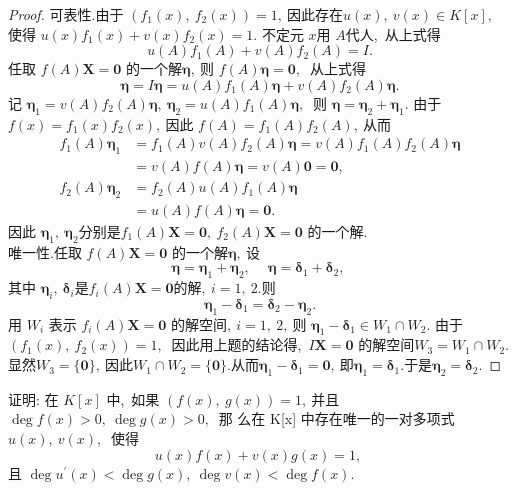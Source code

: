 \begin{proof}
	可表性.由于  $\left(f_{1}(x),\  f_{2}(x)\right)=1 ,\  $因此存在$  u(x),\  v(x) \in K[x] ,\ $ 使得  $u(x) f_{1}(x)+v(x) f_{2}(x)=1 .$
	不定元 $ x  $用  $A  $代人,\  从上式得
	$$u(A) f_{1}(A)+v(A) f_{2}(A)=I .$$
	任取 $ f(A) \boldsymbol{X}=\boldsymbol{0} $ 的一个解$  \boldsymbol{\eta} ,\  $则  $f(A) \boldsymbol{\eta}=\mathbf{0} ,\ $ 从上式得
	$$\boldsymbol{\eta}=I \boldsymbol{\eta}=u(A) f_{1}(A) \boldsymbol{\eta}+v(A) f_{2}(A) \boldsymbol{\eta} .$$
	记  $\boldsymbol{\eta}_{1}=v(A) f_{2}(A) \boldsymbol{\eta},\  \boldsymbol{\eta}_{2}=u(A) f_{1}(A) \boldsymbol{\eta} ,\ $ 则 $ \boldsymbol{\eta}=\boldsymbol{\eta}_{2}+\boldsymbol{\eta}_{1}  .$
	由于$  f(x)=f_{1}(x) f_{2}(x) ,\  $因此 $ f(A)=f_{1}(A) f_{2}(A) ,\  $从而
	$$\begin{aligned}
		f_{1}(A) \boldsymbol{\eta}_{1} & =f_{1}(A) v(A) f_{2}(A) \boldsymbol{\eta}=v(A) f_{1}(A) f_{2}(A) \boldsymbol{\eta} \\
		& =v(A) f(A) \boldsymbol{\eta}=v(A) \boldsymbol{0}=\mathbf{0},\  \\
		f_{2}(A) \boldsymbol{\eta}_{2} & =f_{2}(A) u(A) f_{1}(A) \boldsymbol{\eta} \\
		& =u(A) f(A) \boldsymbol{\eta}=\mathbf{0} .
	\end{aligned}$$
	因此  $\boldsymbol{\eta}_{1},\  \boldsymbol{\eta}_{2}  分别是  f_{1}(A) \boldsymbol{X}=\mathbf{0},\  f_{2}(A) \boldsymbol{X}=\boldsymbol{0}$  的一个解.\\
	唯一性.任取 $ f(A) \boldsymbol{X}=\boldsymbol{0} $ 的一个解$  \boldsymbol{\eta} ,\  $设
	$$\boldsymbol{\eta}=\boldsymbol{\eta}_{1}+\boldsymbol{\eta}_{2},\  \quad \boldsymbol{\eta}=\boldsymbol{\delta}_{1}+\boldsymbol{\delta}_{2},\ $$
	其中  $\boldsymbol{\eta}_{i} ,\ \boldsymbol{\delta}_{i}  $是$  f_{i}(A) \boldsymbol{X}=\mathbf{0}  $的解$,\   i=1,\ 2  .$则
	$$\boldsymbol{\eta}_{1}-\boldsymbol{\delta}_{1}=\boldsymbol{\delta}_{2}-\boldsymbol{\eta}_{2} .$$
	用 $ W_{i}$  表示 $ f_{i}(A) \boldsymbol{X}=\mathbf{0} $ 的解空间$,\   i=1,\ 2 ,\  $则  $\boldsymbol{\eta}_{1}-\boldsymbol{\delta}_{1} \in W_{1} \cap W_{2}  .$
	由于 $ \left(f_{1}(x),\  f_{2}(x)\right)=1 ,\ $ 因此用上题的结论得,\  $ I \boldsymbol{X}=\boldsymbol{0} $ 的解空间$  W_{3}=W_{1} \cap W_{2}  .$显然$W_3=\{\boldsymbol{0}\},\ $因此$W_1\cap W_2=\{\boldsymbol{0}\}.$从而$\boldsymbol{\eta}_1-\boldsymbol{\delta}_1=\boldsymbol{0},\ $即$\boldsymbol{\eta}_1=\boldsymbol{\delta}_1.$于是$\boldsymbol{\eta}_2=\boldsymbol{\delta}_2.$
\end{proof}
\newpage
\begin{problem}
	证明: 在 $ K[x] $ 中,\  如果 $ (f(x),\  g(x))=1 ,\  $并且 $ \operatorname{deg} f(x)>0 ,\   \operatorname{deg} g(x)>0 ,\ $ 那 么在  K[x]  中存在唯一的一对多项式  $u(x),\  v(x) ,\ $ 使得
	$$u(x) f(x)+v(x) g(x)=1,\ $$
	且  $\operatorname{deg} u^{\prime}(x)<\operatorname{deg} g(x),\  \operatorname{deg} v(x)<\operatorname{deg} f(x)  .$
\end{problem}
